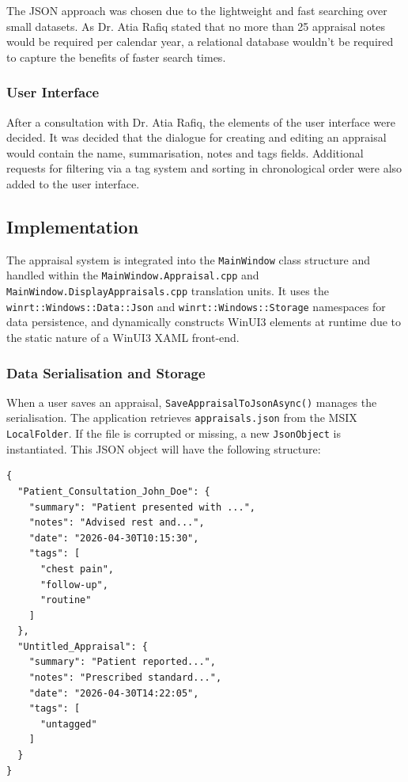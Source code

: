 The JSON approach was chosen due to the lightweight and fast searching over small datasets. As Dr. Atia Rafiq stated that no more than 25 appraisal notes would be required per calendar year, a relational database wouldn't be required to capture the benefits of faster search times.

\subsubsection{User Interface}
After a consultation with Dr. Atia Rafiq, the elements of the user interface were decided. It was decided that the dialogue for creating and editing an appraisal would contain the name, summarisation, notes and tags fields. Additional requests for filtering via a tag system and sorting in chronological order were also added to the user interface.

\subsection{Implementation}
The appraisal system is integrated into the \texttt{MainWindow} class structure and handled within the \texttt{MainWindow.Appraisal.cpp} and \texttt{MainWindow.DisplayAppraisals.cpp} translation units. It uses the \texttt{winrt::Windows::Data::Json} and \texttt{winrt::Windows::Storage} namespaces for data persistence, and dynamically constructs WinUI3 elements at runtime due to the static nature of a WinUI3 XAML front-end.

\subsubsection{Data Serialisation and Storage}
When a user saves an appraisal, \texttt{SaveAppraisalToJsonAsync()} manages the serialisation. The application retrieves \texttt{appraisals.json} from the MSIX \texttt{LocalFolder}. If the file is corrupted or missing, a new \texttt{JsonObject} is instantiated. This JSON object will have the following structure:

\begin{verbatim}
{
  "Patient_Consultation_John_Doe": {
    "summary": "Patient presented with ...",
    "notes": "Advised rest and...",
    "date": "2026-04-30T10:15:30",
    "tags": [
      "chest pain",
      "follow-up",
      "routine"
    ]
  },
  "Untitled_Appraisal": {
    "summary": "Patient reported...",
    "notes": "Prescribed standard...",
    "date": "2026-04-30T14:22:05",
    "tags": [
      "untagged"
    ]
  }
}
\end{verbatim}

